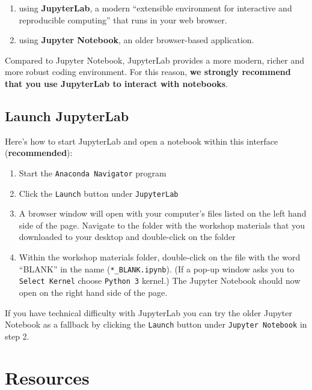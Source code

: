 \documentclass[]{book}
\providecommand{\tightlist}{%
  \setlength{\itemsep}{0pt}\setlength{\parskip}{0pt}}
\begin{document}
\begin{enumerate}
\def\labelenumi{\arabic{enumi}.}
\tightlist
\item
  using \textbf{JupyterLab}, a modern ``extensible environment for interactive and reproducible computing'' that runs in your web browser.
\item
  using \textbf{Jupyter Notebook}, an older browser-based application.
\end{enumerate}

Compared to Jupyter Notebook, JupyterLab provides a more modern, richer and more robust coding environment. For this reason, \textbf{we strongly recommend that you use JupyterLab to interact with notebooks}.

\hypertarget{launch-jupyterlab}{%
\subsection{Launch JupyterLab}\label{launch-jupyterlab}}

Here's how to start JupyterLab and open a notebook within this interface (\textbf{recommended}):

\begin{enumerate}
\def\labelenumi{\arabic{enumi}.}
\tightlist
\item
  Start the \texttt{Anaconda\ Navigator} program
\item
  Click the \texttt{Launch} button under \texttt{JupyterLab}
\item
  A browser window will open with your computer's files listed on the left hand side of the page. Navigate to the folder with the workshop materials that you downloaded to your desktop and double-click on the folder
\item
  Within the workshop materials folder, double-click on the file with the word ``BLANK'' in the name (\texttt{*\_BLANK.ipynb}). (If a pop-up window asks you to \texttt{Select\ Kernel} choose \texttt{Python\ 3} kernel.) The Jupyter Notebook should now open on the right hand side of the page.
\end{enumerate}

If you have technical difficulty with JupyterLab you can try the older Jupyter Notebook as a fallback by clicking the \texttt{Launch} button under \texttt{Jupyter\ Notebook} in step 2.

\hypertarget{resources-6}{%
\section{Resources}\label{resources-6}}
\end{document}
